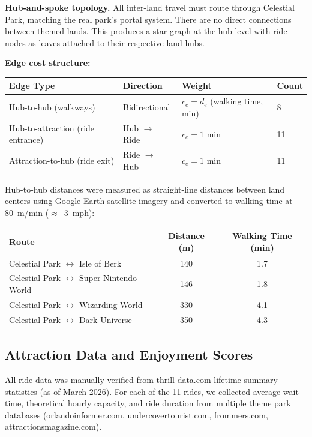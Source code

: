 \documentclass[11pt]{article}
\begin{document}
\textbf{Hub-and-spoke topology.} All inter-land travel must route through Celestial Park, matching the real park's portal system. There are no direct connections between themed lands. This produces a star graph at the hub level with ride nodes as leaves attached to their respective land hubs.

\textbf{Edge cost structure:}

\begin{table}[H]
\centering
\begin{tabular}{llll}
\toprule
\textbf{Edge Type} & \textbf{Direction} & \textbf{Weight} & \textbf{Count} \\
\midrule
Hub-to-hub (walkways) & Bidirectional & $c_e = d_e$ (walking time, min) & 8 \\
Hub-to-attraction (ride entrance) & Hub $\to$ Ride & $c_e = 1$ min & 11 \\
Attraction-to-hub (ride exit) & Ride $\to$ Hub & $c_e = 1$ min & 11 \\
\bottomrule
\end{tabular}
\end{table}

Hub-to-hub distances were measured as straight-line distances between land centers using Google Earth satellite imagery and converted to walking time at 80~m/min ($\approx$~3~mph):

\begin{table}[H]
\centering
\begin{tabular}{lcc}
\toprule
\textbf{Route} & \textbf{Distance (m)} & \textbf{Walking Time (min)} \\
\midrule
Celestial Park $\leftrightarrow$ Isle of Berk & 140 & 1.7 \\
Celestial Park $\leftrightarrow$ Super Nintendo World & 146 & 1.8 \\
Celestial Park $\leftrightarrow$ Wizarding World & 330 & 4.1 \\
Celestial Park $\leftrightarrow$ Dark Universe & 350 & 4.3 \\
\bottomrule
\end{tabular}
\end{table}

\subsection{Attraction Data and Enjoyment Scores}

All ride data was manually verified from thrill-data.com lifetime summary statistics (as of March 2026). For each of the 11 rides, we collected average wait time, theoretical hourly capacity, and ride duration from multiple theme park databases (orlandoinformer.com, undercovertourist.com, frommers.com, attractionsmagazine.com).
\end{document}
